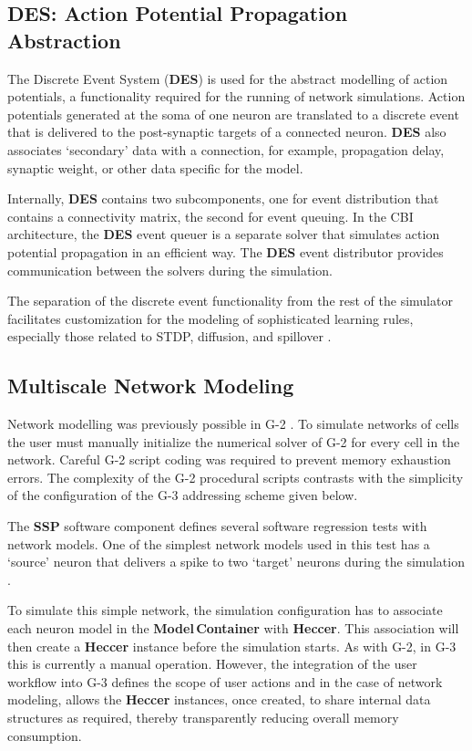 \documentclass[11pt,3p,twocolumn]{JMN}
\begin{document}
\subsection{DES: Action Potential Propagation Abstraction}

The Discrete Event System ({\bf DES}) is used for the abstract modelling of action potentials, a functionality required for the running of network simulations.  Action potentials generated at the soma of one neuron are translated to a discrete event that is delivered to the post-synaptic targets of a connected neuron.  {\bf  DES} also associates `secondary' data with a connection, for example, propagation delay, synaptic weight, or other data specific for the model.

Internally, {\bf DES} contains two subcomponents, one for event distribution that contains a connectivity matrix, the second for event queuing.  In the CBI architecture, the {\bf DES} event queuer is a separate solver that simulates action potential propagation in an efficient way.  The {\bf DES} event distributor provides communication between the solvers during the simulation.

The separation of the discrete event functionality from the rest of the simulator facilitates customization for the modeling of sophisticated learning rules, especially those related to STDP, diffusion, and spillover \cite{roberts02:_spike, nowotny03:_enhan}.

\subsection{Multiscale Network Modeling}

Network modelling was previously possible in G-2 \cite{cornelis02:_tutor}.  To simulate networks of cells the user must manually initialize the numerical solver of G-2 for every cell in the network.  Careful G-2 script coding was required to prevent memory exhaustion errors.  The complexity of the G-2 procedural scripts contrasts with the simplicity of the configuration of the G-3 addressing scheme given below.

The {\bf SSP} software component defines several software regression tests with network models.  One of the simplest network models used in
this test has a `source' neuron that delivers a spike to two `target' neurons during the simulation .

To simulate this simple network, the simulation configuration has to associate each neuron model in the {\bf Model\,Container} with {\bf   Heccer}.  This association will then create a {\bf Heccer} instance before the simulation starts.  As with G-2, in G-3 this is currently a manual operation.
However, the integration of the user workflow into G-3 defines the scope of user actions and in the case of network modeling, allows the {\bf Heccer} instances, once created, to share internal data structures as required, thereby transparently reducing overall memory consumption.
\end{document}
